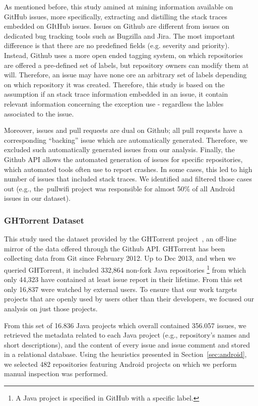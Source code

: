\documentclass[conference]{IEEEtran}
\begin{document}
As mentioned before, this study amined at mining information available on GitHub issues,
more specifically, extracting and distilling the stack traces embedded on GItHub issues. 
Issues on Github are different from issues on dedicated bug tracking tools such as 
Bugzilla and Jira. The most important difference is that there are no predefined fields
  (e.g. severity and priority). Instead, Github uses a more open ended tagging system, on which
repositories are offered a pre-defined set of labels, but repository owners can modify 
them at will. Therefore, an issue may have none ore an arbitrary set of labels depending 
on which repository it was created. Therefore, this study is based on the assumption 
if an stack trace information embedded in an issue, it contain relevant information
 concerning the exception use -  regardless the lables associated to the issue.

Moreover, issues and pull requests are dual on Github; all pull requests have a corresponding 
``backing'' issue which
are automatically generated. Therefore, we excluded such automatically generated
issues from our analysis. Finally, the Github API allows the automated
generation of issues for specific repositories, which automated tools often use
to report crashes. In some cases, this led to high number of issues that
included stack traces. We identified and filtered those cases out (e.g.,
the~\textsf{pullwifi} project was responsible for almost 50\% of all Android issues in our dataset).

\subsubsection{GHTorrent Dataset} This study used the dataset provided by the GHTorrent project~\cite{Gousi13}, an off-line mirror of the data 
offered through the Github API.  GHTorrent has been collecting data from Git since 
February 2012. Up to Dec 2013, and when we queried GHTorrent, it included 332,864 non-fork Java
repositories \footnote {A Java project is specified in GitHub with a
specific label.}  from which only 44,323 have contained at least issue report in their lifetime. From this set only 16,837 were watched by external users. To ensure that our work targets projects that are openly used by
users other than their developers, we focused our analysis on just those projects. 

From this set of 16.836 Java projects which overall contained 356.057 issues, we retrieved the metadata related to each Java project (e.g., repository's names and short descriptions), and the content of every issue and issue comment and stored in a relational database. Using the heuristics presented in Section~\ref{sec:android}, we selected 482 repositories featuring Android projects on which we perform manual inspection was performed.
\end{document}
